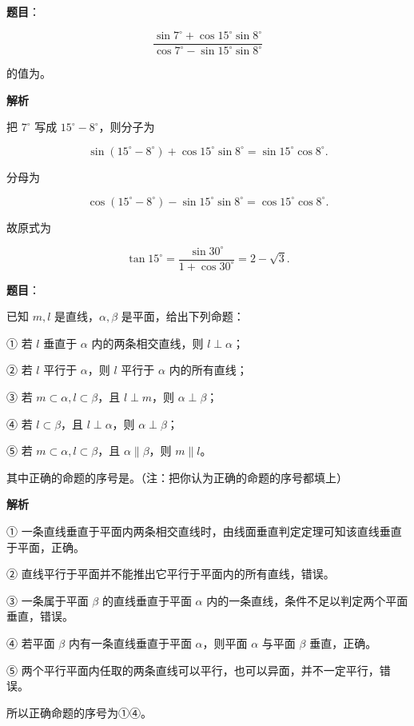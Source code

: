 \begin{answer}

\textbf{题目}：

\nopagebreak[4]
\[
\dfrac{\sin7^\circ+\cos15^\circ\sin8^\circ}
{\cos7^\circ-\sin15^\circ\sin8^\circ}
\]

的值为\gkblank{}。

\textbf{解析}

把 $7^\circ$ 写成 $15^\circ-8^\circ$，则分子为

\nopagebreak[4]
\[
\sin(15^\circ-8^\circ)+\cos15^\circ\sin8^\circ
=\sin15^\circ\cos8^\circ.
\]

分母为

\nopagebreak[4]
\[
\cos(15^\circ-8^\circ)-\sin15^\circ\sin8^\circ
=\cos15^\circ\cos8^\circ.
\]

故原式为

\nopagebreak[4]
\[
\tan15^\circ=\frac{\sin30^\circ}{1+\cos30^\circ}=2-\sqrt3.
\]


\end{answer}
\begin{answer}

\textbf{题目}：

已知 $m,l$ 是直线，$\alpha,\beta$ 是平面，给出下列命题：

① 若 $l$ 垂直于 $\alpha$ 内的两条相交直线，则 $l\perp\alpha$；

② 若 $l$ 平行于 $\alpha$，则 $l$ 平行于 $\alpha$ 内的所有直线；

③ 若 $m\subset\alpha,l\subset\beta$，且 $l\perp m$，则 $\alpha\perp\beta$；

④ 若 $l\subset\beta$，且 $l\perp\alpha$，则 $\alpha\perp\beta$；

⑤ 若 $m\subset\alpha,l\subset\beta$，且 $\alpha\parallel\beta$，则 $m\parallel l$。

其中正确的命题的序号是\gkblank{}。（注：把你认为正确的命题的序号都填上）

\textbf{解析}

① 一条直线垂直于平面内两条相交直线时，由线面垂直判定定理可知该直线垂直于平面，正确。

② 直线平行于平面并不能推出它平行于平面内的所有直线，错误。

③ 一条属于平面 $\beta$ 的直线垂直于平面 $\alpha$ 内的一条直线，条件不足以判定两个平面垂直，错误。

④ 若平面 $\beta$ 内有一条直线垂直于平面 $\alpha$，则平面 $\alpha$ 与平面 $\beta$ 垂直，正确。

⑤ 两个平行平面内任取的两条直线可以平行，也可以异面，并不一定平行，错误。

所以正确命题的序号为①④。


\end{answer}
